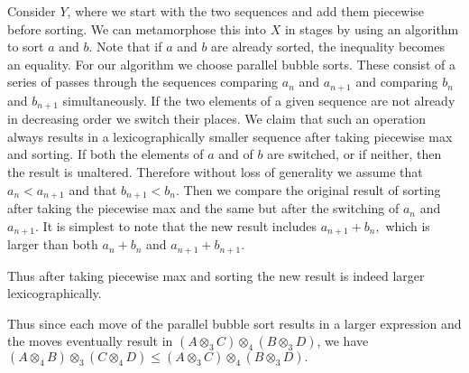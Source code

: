 \documentclass{tac}
\begin{document}
{\begin{enumerate}
Consider $Y$, where we start with the two sequences and add them 
piecewise before sorting. We can metamorphose this
into $X$ in stages by using an algorithm to sort $a$ and $b$. Note that if $a$ and $b$ are
already sorted, the inequality becomes an equality.
For our algorithm we choose parallel bubble sorts. These consist
of a series of passes through the sequences comparing $a_n$ and $a_{n+1}$ and  comparing $b_n$ and $b_{n+1}$
simultaneously. If the two elements of a given sequence are not already in decreasing order we 
switch their places. We claim that such an operation always results in a lexicographically smaller
sequence after taking piecewise max and sorting. If both the elements of $a$ and of $b$ are switched, or if neither,
then the result is unaltered. Therefore without loss of generality we assume that $a_n < a_{n+1}$
and that $b_{n+1} < b_n.$ Then we compare the original
result of sorting after taking the piecewise max and the same but after the switching of $a_n$ and
$a_{n+1}.$ It is simplest to note that the new result includes $a_{n+1} + b_n,$ which is larger than
both $a_n + b_n$ and $a_{n+1} + b_{n+1}.$ 

Thus after taking piecewise max
and sorting the new result is indeed larger lexicographically. 

Thus since each move of the parallel bubble sort results in a larger expression  and the moves
eventually result in $(A \otimes_3 C)\otimes_4 (B \otimes_3 D)$, we have $(A \otimes_4 B)\otimes_3(C \otimes_4 D) \le(A \otimes_3 C)\otimes_4 (B \otimes_3 D).$




\end{enumerate}}
\end{document}
